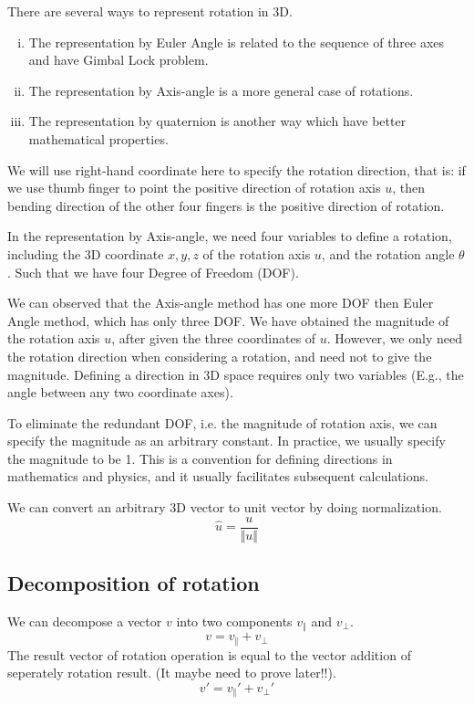 \documentclass[runningheads,a4paper,english]{llncs}[2022/01/12]
\newcommand{\Clen}[1]{\Vert #1\Vert}
\begin{document}
There are several ways to represent rotation in 3D.
\begin{enumerate}[i.]
\item The representation by Euler Angle is related to the sequence of three axes and have Gimbal Lock problem.
\item The representation by Axis-angle is a more general case of rotations.
\item The representation by quaternion is another way which have better mathematical properties.
\end{enumerate}

We will use right-hand coordinate here to specify the rotation direction, that is: if we use thumb finger to point the positive direction of rotation axis $u$, then bending direction of the other four fingers is the positive direction of rotation.

In the representation by Axis-angle, we need four variables to define a rotation, including the 3D coordinate $x,y,z$ of the rotation axis $u$, and the rotation angle $\theta$.
Such that we have four Degree of Freedom (DOF).

We can observed that the Axis-angle method has one more DOF then Euler Angle method, which has only three DOF.
We have obtained the magnitude of the rotation axis $u$, after given the three coordinates of $u$.
However, we only need the rotation direction when considering a rotation, and need not to give the magnitude.
Defining a direction in 3D space requires only two variables (E.g., the angle between any two coordinate axes).

To eliminate the redundant DOF, i.e. the magnitude of rotation axis, we can specify the magnitude as an arbitrary constant.
In practice, we usually specify the magnitude to be 1.
This is a convention for defining directions in mathematics and physics, and it usually facilitates subsequent calculations.

We can convert an arbitrary 3D vector to unit vector by doing normalization.
\begin{equation}
  \hat{u}=\frac{u}{\Clen{u}}
\end{equation}

\subsection{Decomposition of rotation}
We can decompose a vector $v$ into two components $v_{\Vert}$ and $v_{\perp}$.
\begin{equation}
  v=v_{\Vert} + v_{\perp}
\end{equation}
The result vector of rotation operation is equal to the vector addition of seperately rotation result.
(It maybe need to prove later!!).
\begin{equation}
  v'=v_{\Vert}' + v_{\perp}'
\end{equation}
\end{document}
